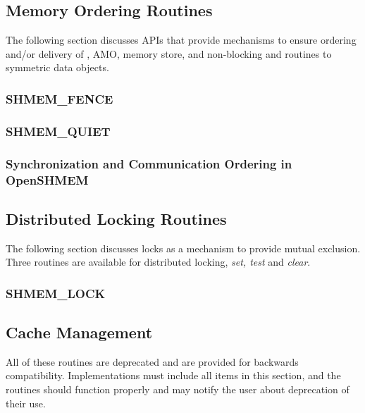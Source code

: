 \documentclass[10pt]{book}
\begin{document}
\subsection{Memory Ordering Routines}\label{subsec:memory_order}
The following section discusses \openshmem \acp{API} that provide mechanisms to
ensure ordering and/or delivery of , \ac{AMO}, memory store,
and non-blocking \PUT{} and \GET{} routines to symmetric data objects.

\subsubsection{\textbf{SHMEM\_FENCE}}\label{subsec:shmem_fence}


\subsubsection{\textbf{SHMEM\_QUIET}}\label{subsec:shmem_quiet}


\subsubsection{Synchronization and Communication Ordering in OpenSHMEM}







\subsection{Distributed Locking Routines}
The following section discusses \openshmem locks as a mechanism to provide
mutual exclusion. Three routines are available for distributed locking,
\textit{set, test} and \textit{clear}.

\subsubsection{\textbf{SHMEM\_LOCK}}\label{subsec:shmem_lock}






\subsection{Cache Management}
All of these routines are deprecated and are provided for backwards
compatibility.  Implementations must include all items in this section, and the
routines should function properly and may notify the user about deprecation of
their use.
\end{document}
